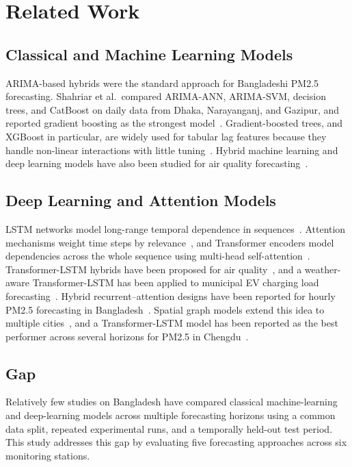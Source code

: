 \documentclass[conference]{IEEEtran}
\begin{document}
\section{Related Work}

\subsection{Classical and Machine Learning Models}
ARIMA-based hybrids were the standard approach for Bangladeshi PM2.5 forecasting. Shahriar et al.\ compared ARIMA-ANN, ARIMA-SVM, decision trees, and CatBoost on daily data from Dhaka, Narayanganj, and Gazipur, and reported gradient boosting as the strongest model~\cite{shahriar2021}. Gradient-boosted trees, and XGBoost in particular, are widely used for tabular lag features because they handle non-linear interactions with little tuning~\cite{chen2016}. Hybrid machine learning and deep learning models have also been studied for air quality forecasting~\cite{mehregan,jesupriya,anggraini}.

\subsection{Deep Learning and Attention Models}
LSTM networks model long-range temporal dependence in sequences~\cite{hochreiter1997}. Attention mechanisms weight time steps by relevance~\cite{bahdanau2015}, and Transformer encoders model dependencies across the whole sequence using multi-head self-attention~\cite{vaswani2017}. Transformer-LSTM hybrids have been proposed for air quality~\cite{liu2025}, and a weather-aware Transformer-LSTM has been applied to municipal EV charging load forecasting~\cite{das}. Hybrid recurrent--attention designs have been reported for hourly PM2.5 forecasting in Bangladesh~\cite{ahmed2026}. Spatial graph models extend this idea to multiple cities~\cite{nobin2026}, and a Transformer-LSTM model has been reported as the best performer across several horizons for PM2.5 in Chengdu~\cite{zeng2026}.

\subsection{Gap}
Relatively few studies on Bangladesh have compared classical machine-learning and deep-learning models across multiple forecasting horizons using a common data split, repeated experimental runs, and a temporally held-out test period. This study addresses this gap by evaluating five forecasting approaches across six monitoring stations.
\end{document}
